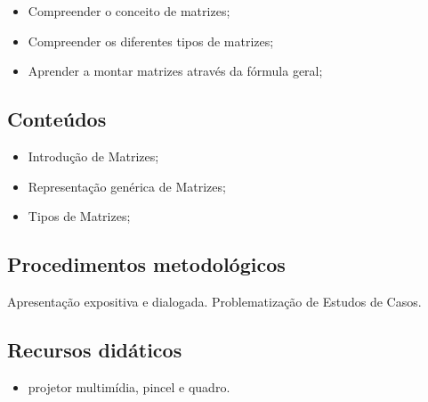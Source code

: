 \documentclass[oneside,a4paper,12pt]{article}
\begin{document}
    \begin{itemize}
      
      \item Compreender o conceito de matrizes;
      \item Compreender os diferentes tipos de matrizes;
      \item Aprender a montar matrizes através da fórmula geral;
      
    \end{itemize}
  
  \begin{snugshade}
  \section{Conteúdos} %
  \end{snugshade}

    \begin{itemize}
      
      \item Introdução de Matrizes;
      \item Representação genérica de Matrizes;
      \item Tipos de Matrizes;
      
    \end{itemize}

  \begin{snugshade}
  \section{Procedimentos metodológicos} %
  \end{snugshade}

	Apresentação expositiva e dialogada. Problematização de Estudos de Casos.
	  
  \begin{snugshade}
  \section{Recursos didáticos} %
  \end{snugshade}
  
    \begin{itemize}

	  \item projetor multimídia, pincel e quadro.
	  
    \end{itemize}
  
\end{document}
